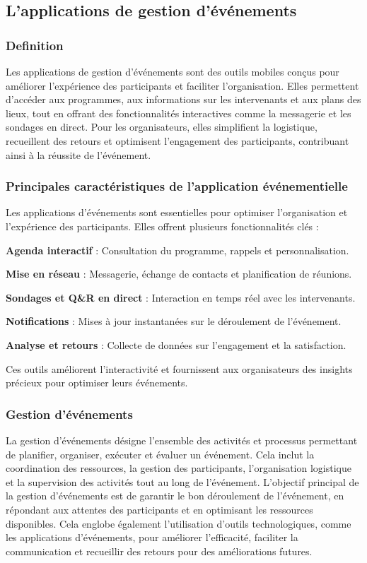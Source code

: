 \subsection{L'applications de gestion d’événements}
\subsubsection{Definition}
Les applications de gestion d’événements sont des outils mobiles conçus pour améliorer l’expérience des participants et faciliter l’organisation. Elles permettent d’accéder aux programmes, aux informations sur les intervenants et aux plans des lieux, tout en offrant des fonctionnalités interactives comme la messagerie et les sondages en direct. Pour les organisateurs, elles simplifient la logistique, recueillent des retours et optimisent l’engagement des participants, contribuant ainsi à la réussite de l’événement.

\subsubsection{Principales caractéristiques de l'application événementielle}


Les applications d’événements sont essentielles pour optimiser l’organisation et l’expérience des participants. Elles offrent plusieurs fonctionnalités clés :

\textbf{Agenda interactif} : Consultation du programme, rappels et personnalisation.

\textbf{Mise en réseau} : Messagerie, échange de contacts et planification de réunions.

\textbf{Sondages et Q\&R en direct} : Interaction en temps réel avec les intervenants.

\textbf{Notifications} : Mises à jour instantanées sur le déroulement de l’événement.

\textbf{Analyse et retours} : Collecte de données sur l’engagement et la satisfaction.


Ces outils améliorent l’interactivité et fournissent aux organisateurs des insights précieux pour optimiser leurs événements.

\subsubsection{Gestion d'événements} 
La gestion d'événements désigne l'ensemble des activités et processus permettant de planifier, organiser, exécuter et évaluer un événement. Cela inclut la coordination des ressources, la gestion des participants, l'organisation logistique et la supervision des activités tout au long de l'événement. L'objectif principal de la gestion d'événements est de garantir le bon déroulement de l'événement, en répondant aux attentes des participants et en optimisant les ressources disponibles. Cela englobe également l'utilisation d'outils technologiques, comme les applications d'événements, pour améliorer l'efficacité, faciliter la communication et recueillir des retours pour des améliorations futures.
